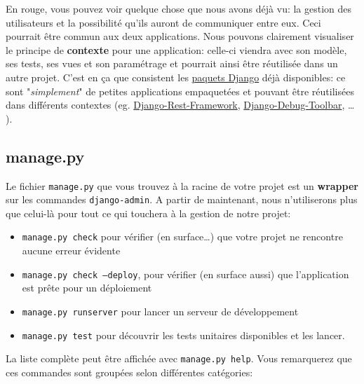 \documentclass[11pt]{amsbook}
\begin{document}
En rouge, vous pouvez voir quelque chose que nous avons déjà vu: la gestion des utilisateurs et la possibilité qu’ils auront de communiquer entre eux.
Ceci pourrait être commun aux deux applications.
Nous pouvons clairement visualiser le principe de \textbf{contexte} pour une application: celle-ci viendra avec son modèle, ses tests, ses vues et son paramétrage et pourrait ainsi être réutilisée dans un autre projet.
C’est en ça que consistent les \href{https://www.djangopackages.com/}{paquets Django} déjà disponibles: ce sont "\emph{simplement}" de petites applications empaquetées et pouvant être réutilisées dans différents contextes (eg. \href{https://github.com/tomchristie/django-rest-framework}{Django-Rest-Framework}, \href{https://github.com/django-debug-toolbar/django-debug-toolbar}{Django-Debug-Toolbar}, …​).


\hypertarget{x-manage.py}{\subsection{manage.py}}
Le fichier \texttt{manage.py} que vous trouvez à la racine de votre projet est un \textbf{wrapper} sur les commandes \texttt{django-admin}.
A partir de maintenant, nous n’utiliserons plus que celui-là pour tout ce qui touchera à la gestion de notre projet:


\begin{itemize}

\item \texttt{manage.py check} pour vérifier (en surface…​) que votre projet ne rencontre aucune erreur évidente

\item \texttt{manage.py check --deploy}, pour vérifier (en surface aussi) que l’application est prête pour un déploiement

\item \texttt{manage.py runserver} pour lancer un serveur de développement

\item \texttt{manage.py test} pour découvrir les tests unitaires disponibles et les lancer.

\end{itemize}


La liste complète peut être affichée avec \texttt{manage.py help}.
Vous remarquerez que ces commandes sont groupées selon différentes catégories:
\end{document}
